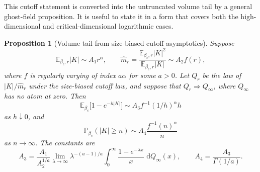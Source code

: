 \documentclass[11pt,reqno]{book}
\numberwithin{equation}{chapter}
\theoremstyle{plain}
\newtheorem{prop}[theorem]{Proposition}
\theoremstyle{definition}
\theoremstyle{remark}
\newcommand{\1}{\mathbf 1}
\newcommand{\dd}{\,\mathrm d}
\begin{document}
This cutoff statement is converted into the untruncated volume tail by a
general ghost-field proposition. It is useful to state it in a form that
covers both the high-dimensional and critical-dimensional logarithmic cases.

\begin{prop}[Volume tail from size-biased cutoff asymptotics]
Suppose
\[
  \mathbb E_{\beta_c,r}|K|\sim A_1r^\alpha,
  \qquad
  \widehat m_r
  =
  \frac{\mathbb E_{\beta_c,r}|K|^2}{\mathbb E_{\beta_c,r}|K|}
  \sim A_2 f(r),
\]
where \(f\) is regularly varying of index \(a\alpha\) for some \(a>0\). Let
\(Q_r\) be the law of \(|K|/\widehat m_r\) under the size-biased cutoff law,
and suppose that \(Q_r\Rightarrow Q_\infty\), where \(Q_\infty\) has no atom
at zero. Then
\[
  \mathbb E_{\beta_c}\bigl[1-e^{-h|K|}\bigr]
  \sim
  A_3 f^{-1}(1/h)^\alpha h
\]
as \(h\downarrow0\), and
\[
  \mathbb P_{\beta_c}(|K|\geq n)
  \sim
  A_4\frac{f^{-1}(n)^\alpha}{n}
\]
as \(n\to\infty\). The constants are
\[
  A_3=
  \frac{A_1}{A_2^{1/a}}
  \lim_{\lambda\to\infty}
  \lambda^{-(a-1)/a}
  \int_0^\infty\frac{1-e^{-\lambda x}}{x}\,\dd Q_\infty(x),
  \qquad
  A_4=\frac{A_3}{\Gamma(1/a)}.
\]
\end{prop}
\end{document}
